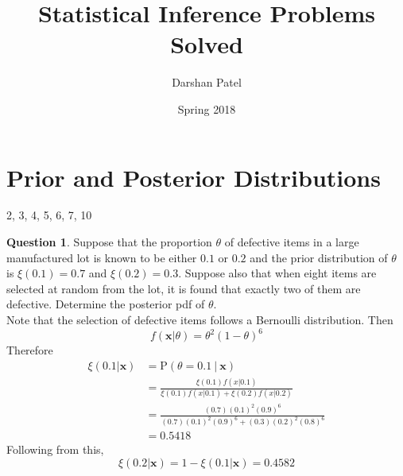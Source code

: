\documentclass[12pt]{article}
\begin{document}
\theoremstyle{definition}
\newtheorem{question}{Question}[section]

\newcommand{\bv}[1]{\boldsymbol{#1}}
\newcommand{\set}[1]{\Big\{ #1 \Big\}}
\newcommand{\expe}[1]{\mathrm{E}[ #1 ]}
\renewcommand{\var}[1]{\mathrm{Var}[ #1 ]}
\newcommand{\prob}[1]{\mathrm{P}( #1 )}
\newcommand{\cprob}[2]{\mathrm{P}(#1 ~|~ #2)}
\newcommand{\bern}[1]{\mathrm{Bernoulli}( #1 )}
\newcommand{\geom}[1]{\text{Geometric}( #1 )}
\newcommand{\binomial}[1]{\text{Binomial}( #1 )}
\newcommand{\gammad}[1]{\text{Gamma}( #1 )}
\newcommand{\invgammad}[1]{\text{InvGamma}( #1 )}
\newcommand{\betad}[1]{\text{Beta}( #1 )}
\newcommand{\expo}[1]{\text{Exponential}( #1 )}
\newcommand{\ftheta}[1]{f_{\theta}( #1 )}
\newcommand{\thetahat}{\hat{\theta}}
\newcommand{\post}[1]{\xi( #1 )}
\newcommand{\q}[1]{\begin{question} #1 \end{question}}

\title{Statistical Inference Problems Solved}
\author{Darshan Patel}
\date{Spring 2018}
\maketitle

\tableofcontents

\section{Prior and Posterior Distributions} 2, 3, 4, 5, 6, 7, 10
\q{Suppose that the proportion $\theta$ of defective items in a large manufactured lot is known to be either $0.1$ or $0.2$ and the prior distribution of $\theta$ is $\xi(0.1) = 0.7$ and $\xi(0.2) = 0.3$. Suppose also that when eight items are selected at random from the lot, it is found that exactly two of them are defective. Determine the posterior pdf of $\theta$. \\
Note that the selection of defective items follows a Bernoulli distribution. Then $$f(\bv{x} | \theta) = \theta^2(1-\theta)^6$$ 
Therefore $$ \begin{aligned} \xi(0.1 | \bv{x}) &= \cprob{\theta = 0.1}{\bv{x}} \\ &= \frac{\xi(0.1)f(x | 0.1)}{\xi(0.1)f(x|0.1) + \xi(0.2)f(x|0.2)} \\ &= \frac{(0.7)(0.1)^2(0.9)^6}{(0.7)(0.1)^2(0.9)^6 + (0.3)(0.2)^2(0.8)^6} \\ &= 0.5418 \end{aligned} $$ 
Following from this, $$ \xi(0.2 | \bv{x}) = 1 - \xi(0.1 | \bv{x}) = 0.4582$$ }
\end{document}
